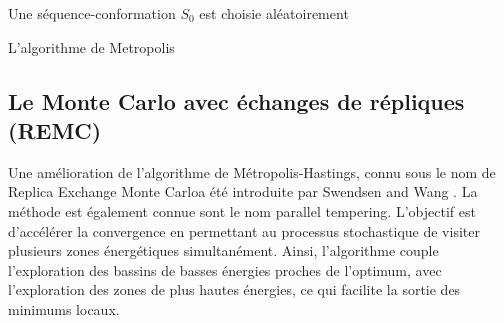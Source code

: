 \begin{algorithm}
  Une séquence-conformation $S_0$ est choisie aléatoirement\;
\caption{L'algorithme de Metropolis} \label{alg:Metro}
\end{algorithm}


\subsection{Le Monte Carlo avec échanges de répliques (REMC)}
\label{REMC}

Une amélioration de l'algorithme de Métropolis-Hastings, connu sous le nom de \og Replica Exchange Monte Carlo\fg a été introduite par Swendsen and Wang \cite{Swendsen86}. La méthode est également connue sont le nom \og parallel tempering\fg. L'objectif est d'accélérer la convergence en permettant au processus stochastique de visiter plusieurs zones énergétiques simultanément. Ainsi, l'algorithme couple l'exploration des bassins de basses énergies proches de l'optimum, avec l'exploration des zones de plus hautes énergies, ce qui facilite la sortie des minimums locaux.

